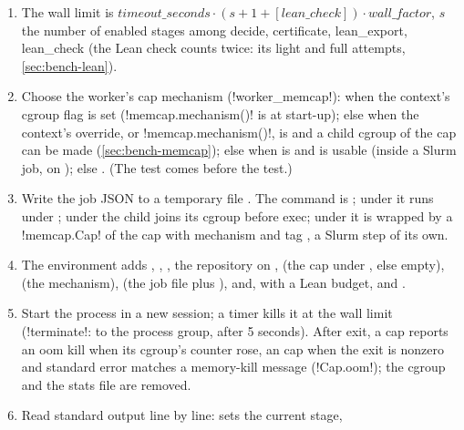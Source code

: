 \begin{algorithm}
\begin{enumerate}
\item The wall limit is $\mathit{timeout\_seconds}\cdot(s+1+[\mathit{lean\_check}])\cdot
  \mathit{wall\_factor}$, $s$ the number of enabled stages among decide, certificate,
  lean\_export, lean\_check (the Lean check counts twice: its light and full attempts,
  \cref{sec:bench-lean}).
\item Choose the worker's cap mechanism (\py!worker_memcap!):  when the context's
  cgroup flag is set (\py!memcap.mechanism()! is  at start-up); else
   when the context's  override, or \py!memcap.mechanism()!, is
   and a child cgroup  of the cap can be made
  (\cref{sec:bench-memcap}); else  when  is 
  and  is usable (inside a Slurm job,  on ); else
  . (The  test comes before the  test.)
\item Write the job JSON to a temporary file . The command is
  ; under  it runs under
  ;
  under  the child joins its cgroup before exec; under  it is wrapped
  by a \py!memcap.Cap! of the cap with mechanism  and tag , a Slurm step
  of its own.
\item The environment adds , ,
  , the repository on ,  (the cap
  under , else empty),  (the mechanism),
   (the job file plus ), and, with a Lean budget,
   and .
\item Start the process in a new session; a timer kills it at the wall limit (\py!terminate!:
   to the process group,  after 5 seconds). After exit, a
   cap reports an oom kill when its cgroup's  counter rose, an
   cap when the exit is nonzero and standard error matches a memory-kill message
  (\py!Cap.oom!); the cgroup and the  stats file are removed.
\item Read standard output line by line:  sets the current stage,

\end{enumerate}
\end{algorithm}
